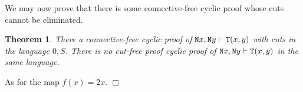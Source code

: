 \documentclass[a4paper,12pt]{article}
\newtheorem{theorem}{Theorem}[section]
\newenvironment{proof}[1][Proof]{\begin{trivlist}
\item[\hskip \labelsep {\bfseries #1}]}{\end{trivlist}}
\newcommand{\Nat}               { {\tt N}  }
\newcommand{\id}              { {\tt id} }
\newcommand{\eq}              { {\tt eq} }
\newcommand{\Tot}           { {\tt T} }
\newcommand{\eqL}     {= \! \!  \!  L}
\newcommand{\eqR}    {= \! \!  \!  R}
\newcommand{\Ack}   {{\tt A}}
\begin{document}

\newpage

We may now prove that there is some connective-free cyclic proof whose cuts cannot be eliminated.


\begin{theorem} 
There a connective-free cyclic proof of $\Nat x, \Nat y \vdash \Tot(x,y)$ with cuts in the language $0,S$. There is no cut-free proof cyclic proof of $\Nat x, \Nat y \vdash \Tot(x,y)$ in the same language. 
\end{theorem}

\begin{proof} As for the map $f(x) = 2x$. $\Box$ \end{proof}

%
%
%
%
%
%
\end{document}
